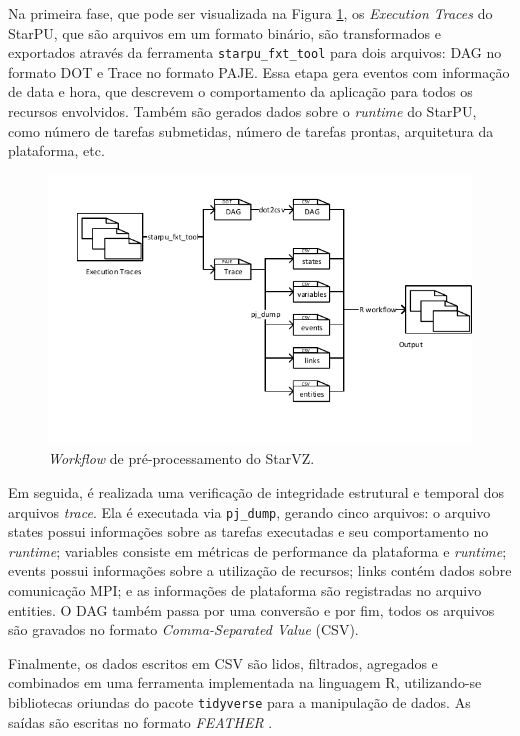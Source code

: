 Na primeira fase, que pode ser visualizada na Figura 
\ref{fig:starvz-workflow1}, 
os 
\emph{Execution Traces} do StarPU, que são arquivos em um formato binário, são 
transformados
e exportados através da ferramenta \texttt{starpu\_fxt\_tool} para dois 
arquivos: DAG no formato DOT 
e Trace no formato PAJE. Essa etapa gera eventos com informação de data e hora, 
que 
descrevem o comportamento da aplicação para todos os recursos envolvidos. 
Também 
são gerados 
dados sobre o \emph{runtime} do StarPU, como número de tarefas submetidas,
número de tarefas prontas, arquitetura da plataforma, etc.

\begin{figure}[ht]
 \centerline{\includegraphics[width=1\textwidth]{./img/step1-final.pdf}}
 \caption{\emph{Workflow} de pré-processamento do StarVZ.}
 \label{fig:starvz-workflow1}
\end{figure}

Em seguida, é realizada uma verificação de integridade estrutural e temporal dos
arquivos \emph{trace}. Ela é executada via \texttt{pj\_dump}, gerando cinco 
arquivos: o arquivo states 
possui informações sobre as tarefas executadas e seu comportamento no 
\emph{runtime}; variables
consiste em métricas de performance da plataforma e \emph{runtime}; events 
possui informações sobre a 
utilização de recursos; links contém dados sobre comunicação MPI; e as 
informações de plataforma 
são registradas no arquivo entities. O DAG também passa por uma conversão e por 
fim, todos os 
arquivos são gravados no formato \emph{Comma-Separated Value} (CSV).

Finalmente, os dados escritos em CSV são lidos, filtrados, agregados e 
combinados em 
uma ferramenta implementada na linguagem R, utilizando-se bibliotecas oriundas 
do pacote 
\texttt{tidyverse} para a manipulação de dados. As saídas são escritas no 
formato \emph{FEATHER}
\cite{ref:feather}.

